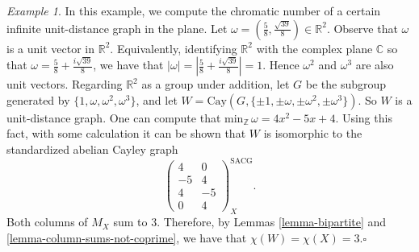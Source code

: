 \documentclass{article}
\theoremstyle{definition}
\theoremstyle{remark}
\newtheorem{Ex}[Thm]{Example}
\begin{document}
\begin{Ex}\label{example-chi-of-plane-root-39}
In this example, we compute the chromatic number of a certain infinite unit-distance graph in the plane.  Let $\omega=\left(\frac{5}{8},\frac{\sqrt{39}}{8}\right)\in\mathbb{R}^2.$  Observe that $\omega$ is a unit vector in $\mathbb{R}^2.$  Equivalently, identifying $\mathbb{R}^2$ with the complex plane $\mathbb{C}$ so that $\omega=\frac{5}{8}+\frac{i\sqrt{39}}{8}$, we have that $|\omega|=\left|\frac{5}{8}+\frac{i\sqrt{39}}{8}\right|=1$.  Hence $\omega^2$ and $\omega^3$ are also unit vectors.  Regarding $\mathbb{R}^2$ as a group under addition, let $G$ be the subgroup generated by $\{1, \omega, \omega^2,\omega^3\}$, and let $W=\text{Cay}(G,\{\pm 1, \pm\omega, \pm\omega^2,\pm\omega^3\}).$  So $W$ is a unit-distance graph.  One can compute that $\text{min}_\mathbb{Z}\,\omega=4x^2-5x+4$.  Using this fact, with some calculation it can be shown that $W$ is isomorphic to the standardized abelian Cayley graph $$\begin{pmatrix}
4 & 0\\
-5 & 4\\
4 & -5\\
0 & 4
\end{pmatrix}^{\text{SACG}}_X.$$  Both columns of $M_X$ sum to $3$.  Therefore, by Lemmas \ref{lemma-bipartite} and \ref{lemma-column-sums-not-coprime}, we have that $\chi(W)=\chi(X)=3$.\hfill  $\square$\end{Ex}
\end{document}
